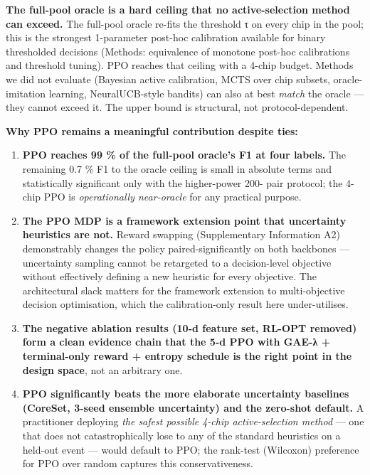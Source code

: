 \textbf{The full-pool oracle is a hard ceiling that no active-selection method
can exceed.} The full-pool oracle re-fits the threshold τ on every chip
in the pool; this is the strongest 1-parameter post-hoc calibration
available for binary thresholded decisions (Methods: equivalence of
monotone post-hoc calibrations and threshold tuning). PPO reaches that
ceiling with a 4-chip budget. Methods we did not evaluate (Bayesian
active calibration, MCTS over chip subsets, oracle-imitation learning,
NeuralUCB-style bandits) can also at best \emph{match} the oracle --- they
cannot exceed it. The upper bound is structural, not protocol-dependent.

\textbf{Why PPO remains a meaningful contribution despite ties:}

\begin{enumerate}
\def\labelenumi{\arabic{enumi}.}
\tightlist
\item
  \textbf{PPO reaches 99 \% of the full-pool oracle's F1 at four labels.}
  The remaining 0.7 \% F1 to the oracle ceiling is small in absolute
  terms and statistically significant only with the higher-power 200-
  pair protocol; the 4-chip PPO is \emph{operationally near-oracle} for
  any practical purpose.
\item
  \textbf{The PPO MDP is a framework extension point that uncertainty
  heuristics are not.} Reward swapping (Supplementary Information A2)
  demonstrably changes the policy paired-significantly on both
  backbones --- uncertainty sampling cannot be retargeted to a
  decision-level objective without effectively defining a new
  heuristic for every objective. The architectural slack matters for
  the framework extension to multi-objective decision optimisation,
  which the calibration-only result here under-utilises.
\item
  \textbf{The negative ablation results (10-d feature set, RL-OPT removed)
  form a clean evidence chain that the 5-d PPO with GAE-λ +
  terminal-only reward + entropy schedule is the right point in the
  design space}, not an arbitrary one.
\item
  \textbf{PPO significantly beats the more elaborate uncertainty baselines
  (CoreSet, 3-seed ensemble uncertainty) and the zero-shot default.}
  A practitioner deploying \emph{the safest possible 4-chip
  active-selection method} --- one that does not catastrophically lose
  to any of the standard heuristics on a held-out event --- would
  default to PPO; the rank-test (Wilcoxon) preference for PPO over
  random captures this conservativeness.
\end{enumerate}

